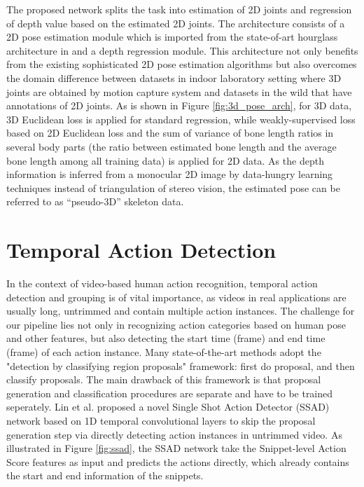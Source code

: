 The proposed network splits the task into estimation of 2D joints and regression of depth value based on the estimated 2D joints. The architecture consists of a 2D pose estimation module which is imported from the state-of-art hourglass architecture in \cite{DBLP:conf/eccv/NewellYD16} and a depth regression module. This architecture not only benefits from the existing sophisticated 2D pose estimation algorithms but also overcomes the domain difference between datasets in indoor laboratory setting where 3D joints are obtained by motion capture system and datasets in the wild that have annotations of 2D joints. As is shown in Figure \ref{fig:3d_pose_arch}, for 3D data, 3D Euclidean loss is applied for standard regression, while weakly-supervised loss based on 2D Euclidean loss and the sum of variance of bone length ratios in several body parts (the ratio between estimated bone length and the average bone length among all training data) is applied for 2D data. As the depth information is inferred from a monocular 2D image by data-hungry learning techniques instead of triangulation of stereo vision, the estimated pose can be referred to as “pseudo-3D” skeleton data.


\section{Temporal Action Detection}
\label{subsec:tem_action_det}
In the context of video-based human action recognition, temporal action detection and grouping is of vital importance, as videos in real applications are usually long, untrimmed and contain multiple action instances. The challenge for our pipeline lies not only in recognizing action categories based on human pose and other features, but also detecting the start time (frame) and end time (frame) of each action instance. Many state-of-the-art methods \cite{DBLP:journals/corr/Girshick15, DBLP:journals/corr/GirshickDDM13, DBLP:journals/corr/RenHG015} adopt the "detection by classifying region proposals" framework: first do proposal, and then classify proposals. The main drawback of this framework is that proposal generation and classification procedures are separate and have to be trained seperately. Lin et al. \cite{lin2017} proposed a novel Single Shot Action Detector (SSAD) network based on 1D temporal convolutional layers to skip the proposal generation step via directly detecting action instances in untrimmed video. As illustrated in Figure \ref{fig:ssad}, the SSAD network take the Snippet-level Action Score features as input and predicts the actions directly, which already contains the start and end information of the snippets. 

